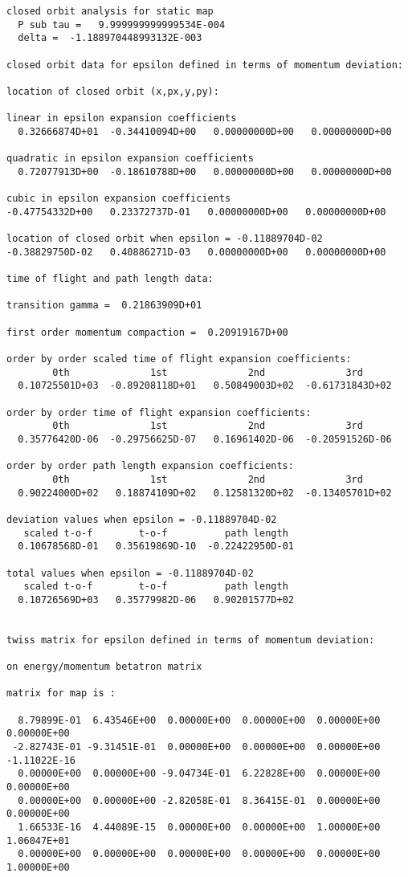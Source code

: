 \begin{footnotesize}
\begin{verbatim}
closed orbit analysis for static map
  P sub tau =   9.999999999999534E-004
  delta =  -1.188970448993132E-003

closed orbit data for epsilon defined in terms of momentum deviation:

location of closed orbit (x,px,y,py):

linear in epsilon expansion coefficients
  0.32666874D+01  -0.34410094D+00   0.00000000D+00   0.00000000D+00

quadratic in epsilon expansion coefficients
  0.72077913D+00  -0.18610788D+00   0.00000000D+00   0.00000000D+00

cubic in epsilon expansion coefficients
-0.47754332D+00   0.23372737D-01   0.00000000D+00   0.00000000D+00

location of closed orbit when epsilon = -0.11889704D-02
-0.38829750D-02   0.40886271D-03   0.00000000D+00   0.00000000D+00

time of flight and path length data:

transition gamma =  0.21863909D+01

first order momentum compaction =  0.20919167D+00

order by order scaled time of flight expansion coefficients:
        0th              1st              2nd              3rd
  0.10725501D+03  -0.89208118D+01   0.50849003D+02  -0.61731843D+02

order by order time of flight expansion coefficients:
        0th              1st              2nd              3rd
  0.35776420D-06  -0.29756625D-07   0.16961402D-06  -0.20591526D-06

order by order path length expansion coefficients:
        0th              1st              2nd              3rd
  0.90224000D+02   0.18874109D+02   0.12581320D+02  -0.13405701D+02

deviation values when epsilon = -0.11889704D-02
   scaled t-o-f        t-o-f          path length
  0.10678568D-01   0.35619869D-10  -0.22422950D-01

total values when epsilon = -0.11889704D-02
   scaled t-o-f        t-o-f          path length
  0.10726569D+03   0.35779982D-06   0.90201577D+02


twiss matrix for epsilon defined in terms of momentum deviation:

on energy/momentum betatron matrix

matrix for map is :

  8.79899E-01  6.43546E+00  0.00000E+00  0.00000E+00  0.00000E+00    0.00000E+00
 -2.82743E-01 -9.31451E-01  0.00000E+00  0.00000E+00  0.00000E+00   -1.11022E-16
  0.00000E+00  0.00000E+00 -9.04734E-01  6.22828E+00  0.00000E+00    0.00000E+00
  0.00000E+00  0.00000E+00 -2.82058E-01  8.36415E-01  0.00000E+00    0.00000E+00
  1.66533E-16  4.44089E-15  0.00000E+00  0.00000E+00  1.00000E+00    1.06047E+01
  0.00000E+00  0.00000E+00  0.00000E+00  0.00000E+00  0.00000E+00    1.00000E+00



\end{verbatim}
\end{footnotesize}
